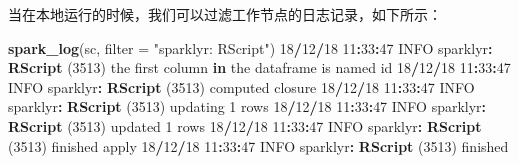 \documentclass[
]{article}
\newenvironment{Shaded}{\begin{snugshade}}{\end{snugshade}}
\newcommand{\CommentTok}[1]{\textcolor[rgb]{0.56,0.35,0.01}{\textit{#1}}}
\newcommand{\ControlFlowTok}[1]{\textcolor[rgb]{0.13,0.29,0.53}{\textbf{#1}}}
\newcommand{\DataTypeTok}[1]{\textcolor[rgb]{0.13,0.29,0.53}{#1}}
\newcommand{\DecValTok}[1]{\textcolor[rgb]{0.00,0.00,0.81}{#1}}
\newcommand{\ErrorTok}[1]{\textcolor[rgb]{0.64,0.00,0.00}{\textbf{#1}}}
\newcommand{\KeywordTok}[1]{\textcolor[rgb]{0.13,0.29,0.53}{\textbf{#1}}}
\newcommand{\NormalTok}[1]{#1}
\newcommand{\OperatorTok}[1]{\textcolor[rgb]{0.81,0.36,0.00}{\textbf{#1}}}
\newcommand{\StringTok}[1]{\textcolor[rgb]{0.31,0.60,0.02}{#1}}
\begin{document}
\begin{Shaded}
\end{Shaded}

当在本地运行的时候，我们可以过滤工作节点的日志记录，如下所示：

\begin{Shaded}
\begin{Highlighting}[]
\KeywordTok{spark_log}\NormalTok{(sc, }\DataTypeTok{filter =} \StringTok{"sparklyr: RScript"}\NormalTok{)}
\DecValTok{18}\OperatorTok{/}\DecValTok{12}\OperatorTok{/}\DecValTok{18} \DecValTok{11}\OperatorTok{:}\DecValTok{33}\OperatorTok{:}\DecValTok{47}\NormalTok{ INFO sparklyr}\OperatorTok{:}\StringTok{ }\KeywordTok{RScript}\NormalTok{ (}\DecValTok{3513}\NormalTok{) the first column }\ControlFlowTok{in}
\NormalTok{the dataframe is named id}
\DecValTok{18}\OperatorTok{/}\DecValTok{12}\OperatorTok{/}\DecValTok{18} \DecValTok{11}\OperatorTok{:}\DecValTok{33}\OperatorTok{:}\DecValTok{47}\NormalTok{ INFO sparklyr}\OperatorTok{:}\StringTok{ }\KeywordTok{RScript}\NormalTok{ (}\DecValTok{3513}\NormalTok{) computed closure}
\DecValTok{18}\OperatorTok{/}\DecValTok{12}\OperatorTok{/}\DecValTok{18} \DecValTok{11}\OperatorTok{:}\DecValTok{33}\OperatorTok{:}\DecValTok{47}\NormalTok{ INFO sparklyr}\OperatorTok{:}\StringTok{ }\KeywordTok{RScript}\NormalTok{ (}\DecValTok{3513}\NormalTok{) updating }\DecValTok{1}\NormalTok{ rows}
\DecValTok{18}\OperatorTok{/}\DecValTok{12}\OperatorTok{/}\DecValTok{18} \DecValTok{11}\OperatorTok{:}\DecValTok{33}\OperatorTok{:}\DecValTok{47}\NormalTok{ INFO sparklyr}\OperatorTok{:}\StringTok{ }\KeywordTok{RScript}\NormalTok{ (}\DecValTok{3513}\NormalTok{) updated }\DecValTok{1}\NormalTok{ rows}
\DecValTok{18}\OperatorTok{/}\DecValTok{12}\OperatorTok{/}\DecValTok{18} \DecValTok{11}\OperatorTok{:}\DecValTok{33}\OperatorTok{:}\DecValTok{47}\NormalTok{ INFO sparklyr}\OperatorTok{:}\StringTok{ }\KeywordTok{RScript}\NormalTok{ (}\DecValTok{3513}\NormalTok{) finished apply}
\DecValTok{18}\OperatorTok{/}\DecValTok{12}\OperatorTok{/}\DecValTok{18} \DecValTok{11}\OperatorTok{:}\DecValTok{33}\OperatorTok{:}\DecValTok{47}\NormalTok{ INFO sparklyr}\OperatorTok{:}\StringTok{ }\KeywordTok{RScript}\NormalTok{ (}\DecValTok{3513}\NormalTok{) finished}
\end{Highlighting}
\end{Shaded}
\end{document}
